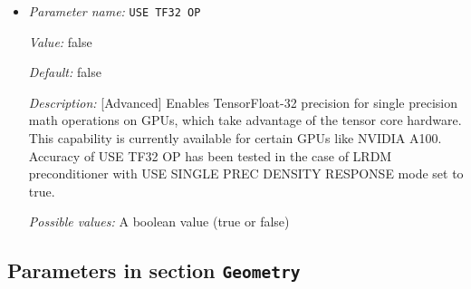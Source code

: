 \begin{itemize}
{\it Possible values:} A boolean value (true or false)
\item {\it Parameter name:} {\tt USE TF32 OP}
\label{parameters:GPU/USE TF32 OP}
\label{parameters:GPU/USE_20TF32_20OP}


{\it Value:} false


{\it Default:} false


{\it Description:} [Advanced] Enables TensorFloat-32 precision for single precision math operations on GPUs, which take advantage of the tensor core hardware. This capability is currently available for certain GPUs like NVIDIA A100. Accuracy of USE TF32 OP has been tested in the case of LRDM preconditioner with USE SINGLE PREC DENSITY RESPONSE mode set to true.


{\it Possible values:} A boolean value (true or false)
\end{itemize}

\subsection{Parameters in section \tt Geometry}
\label{parameters:Geometry}

